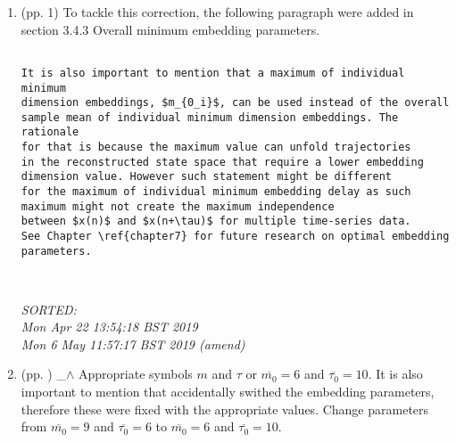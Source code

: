 \documentclass[12pt]{article}
\begin{document}
\begin{enumerate}

\item  (pp. 1)  To tackle this correction, the following paragraph
were added in section 3.4.3 Overall minimum embedding parameters.

	\begin{verbatim}

It is also important to mention that a maximum of individual minimum 
dimension embeddings, $m_{0_i}$, can be used instead of the overall 
sample mean of individual minimum dimension embeddings. The rationale
for that is because the maximum value can unfold trajectories 
in the reconstructed state space that require a lower embedding 
dimension value. However such statement might be different 
for the maximum of individual minimum embedding delay as such 
maximum might not create the maximum independence 
between $x(n)$ and $x(n+\tau)$ for multiple time-series data. 
See Chapter \ref{chapter7} for future research on optimal embedding 
parameters.



	\end{verbatim}
	\textit{
	SORTED: \\
	Mon Apr 22 13:54:18 BST 2019 \\
	Mon  6 May 11:57:17 BST 2019 (amend)
	}
	\\


\item  (pp. )  \_$\wedge$  
	Appropriate symbols $m$ and $\tau$ or 
	$\overline{m_0}=6$ and $\overline{\tau_0}=10$.
	It is also important to mention that accidentally 
	swithed the embedding parameters, therefore these were fixed
	with the appropriate values.
	Change parameters from 
	$\overline{m_0}=9$ and $\overline{\tau_0}=6$
	to
	$\overline{m_0}=6$ and $\overline{\tau_0}=10$.
 

\end{enumerate}
\end{document}
